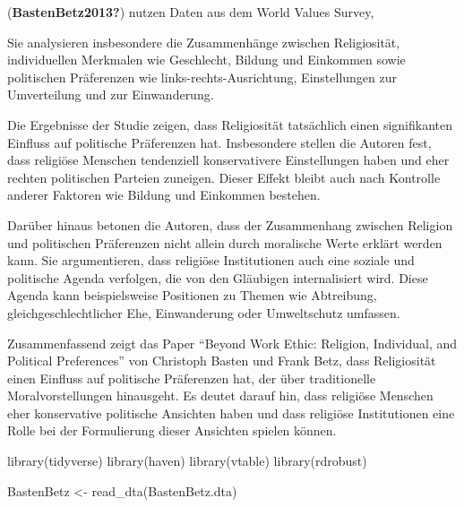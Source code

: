\documentclass[
  letterpaper,
  DIV=11,
  oneside]{scrreprt}
\newenvironment{Shaded}{\begin{snugshade}}{\end{snugshade}}
\newcommand{\FunctionTok}[1]{\textcolor[rgb]{0.28,0.35,0.67}{#1}}
\newcommand{\NormalTok}[1]{\textcolor[rgb]{0.00,0.23,0.31}{#1}}
\newcommand{\OtherTok}[1]{\textcolor[rgb]{0.00,0.23,0.31}{#1}}
\newcommand{\StringTok}[1]{\textcolor[rgb]{0.13,0.47,0.30}{#1}}
\begin{document}
(\textbf{BastenBetz2013?}) nutzen Daten aus dem World Values Survey,

Sie analysieren insbesondere die Zusammenhänge zwischen Religiosität,
individuellen Merkmalen wie Geschlecht, Bildung und Einkommen sowie
politischen Präferenzen wie links-rechts-Ausrichtung, Einstellungen zur
Umverteilung und zur Einwanderung.

Die Ergebnisse der Studie zeigen, dass Religiosität tatsächlich einen
signifikanten Einfluss auf politische Präferenzen hat. Insbesondere
stellen die Autoren fest, dass religiöse Menschen tendenziell
konservativere Einstellungen haben und eher rechten politischen Parteien
zuneigen. Dieser Effekt bleibt auch nach Kontrolle anderer Faktoren wie
Bildung und Einkommen bestehen.

Darüber hinaus betonen die Autoren, dass der Zusammenhang zwischen
Religion und politischen Präferenzen nicht allein durch moralische Werte
erklärt werden kann. Sie argumentieren, dass religiöse Institutionen
auch eine soziale und politische Agenda verfolgen, die von den Gläubigen
internalisiert wird. Diese Agenda kann beispielsweise Positionen zu
Themen wie Abtreibung, gleichgeschlechtlicher Ehe, Einwanderung oder
Umweltschutz umfassen.

Zusammenfassend zeigt das Paper ``Beyond Work Ethic: Religion,
Individual, and Political Preferences'' von Christoph Basten und Frank
Betz, dass Religiosität einen Einfluss auf politische Präferenzen hat,
der über traditionelle Moralvorstellungen hinausgeht. Es deutet darauf
hin, dass religiöse Menschen eher konservative politische Ansichten
haben und dass religiöse Institutionen eine Rolle bei der Formulierung
dieser Ansichten spielen können.

\begin{Shaded}
\begin{Highlighting}[]
\FunctionTok{library}\NormalTok{(tidyverse)}
\FunctionTok{library}\NormalTok{(haven)}
\FunctionTok{library}\NormalTok{(vtable)}
\FunctionTok{library}\NormalTok{(rdrobust)}
\end{Highlighting}
\end{Shaded}

\begin{Shaded}
\begin{Highlighting}[]
\NormalTok{BastenBetz }\OtherTok{\textless{}{-}} \FunctionTok{read\_dta}\NormalTok{(}\StringTok{\textquotesingle{}BastenBetz.dta\textquotesingle{}}\NormalTok{)}
\end{Highlighting}
\end{Shaded}
\end{document}
